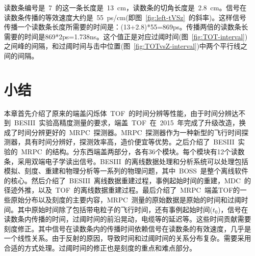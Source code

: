 读数条编号是~7~的这一条长度是~13~cm，读数条的切角长度是~2.8~cm。信号在读数条传播的等效速度大约是~55~ps/cm(即图~\ref{fig:left-tVSz}~的斜率)。这样信号传播一个读数条长度所需要的时间是：(13+2.8)*55=869ps。传播两倍的读数条长需要的时间是869*2ps=1.738ns。这个值正是对应过阈时间(图~\ref{fig:TOT-interval})之间峰的间隔，和过阈时间与击中位置(图~\ref{fig:TOTvsZ-interval})中两个平行线之间的间隔。

\section{小结}
本章首先介绍了原来的端盖闪烁体~TOF~的时间分辨等性能，由于时间分辨达不到~BESIII~实验高精度测量的要求，端盖~TOF~在~2015~年完成了升级改造，换成了时间分辨更好的~MRPC~探测器。MRPC~探测器作为一种新型的飞行时间探测器，具有时间分辨好，探测效率高，造价便宜等优势。之后介绍了~BESIII~实验的~MRPC~的结构。分东西端盖两部分，各有36个模块。每个模块有12个读数条，采用双端电子学读出信号。BESIII~的离线数据处理和分析系统可以处理包括模拟、刻度、重建和物理分析等一系列的物理问题，其中~BOSS~是整个离线软件的核心。然后介绍了~BESIII~离线数据重建过程，事例起始时间的重建，MDC~的径迹外推，以及~TOF~的离线数据重建过程。最后介绍了~MRPC~端盖TOF的一些原始分布以及刻度的主要内容，MRPC~测量的原始数据是原始的时间和过阈时间。其中原始时间除了包括带电粒子的飞行时间，还有事例起始时间($t_{0}$)，信号在读数条内传播的时间，过阈时间的前沿晃动，电缆等的延迟等。这些时间贡献需要刻度修正。其中信号在读数条内的传播时间依赖信号在读数条的有效速度，几乎是一个线性关系。由于反射的原因，导致时间和过阈时间的关系分布复杂。需要采用合适的方式处理。过阈时间的修正也是刻度的重点和难点部分。







